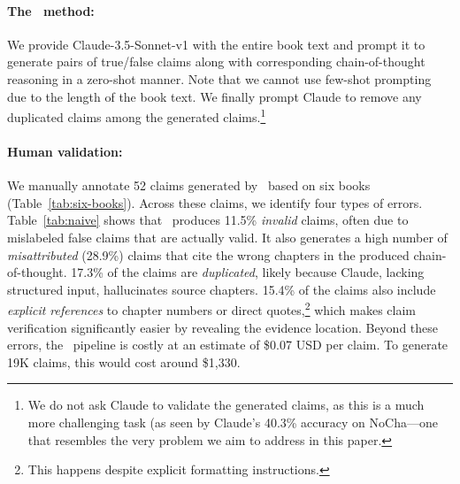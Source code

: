 \paragraph{The \naive\ method:} We provide Claude-3.5-Sonnet-v1 with the entire book text and prompt it to generate pairs of true/false claims along with corresponding chain-of-thought reasoning in a zero-shot manner. Note that we cannot use few-shot prompting due to the length of the book text. We finally prompt Claude to remove any duplicated claims among the generated claims.\footnote{We do not ask Claude to validate the generated claims, as this is a much more challenging task (as seen by Claude's 40.3\% accuracy on NoCha—one that resembles the very problem we aim to address in this paper.} %

\paragraph{Human validation:} We manually annotate 52 claims generated by \naive\ based on six books (Table~\ref{tab:six-books}).
Across these claims, we identify four types of errors. Table~\ref{tab:naive} shows that \naive\ produces 11.5\% \textit{invalid} claims, often due to mislabeled false claims that are actually valid. It also generates a high number of \textit{misattributed} (28.9\%) claims that cite the wrong chapters in the produced chain-of-thought. 17.3\% of the claims are \textit{duplicated}, likely because Claude, lacking structured input, hallucinates source chapters. 15.4\% of the claims also include \textit{explicit references} to chapter numbers or direct quotes,\footnote{This happens despite explicit formatting instructions.} which makes claim verification significantly easier by revealing the evidence location. Beyond these errors, the \naive\ pipeline is costly at an estimate of \$0.07 USD per claim. To generate 19K claims, this would cost around \$1,330.

